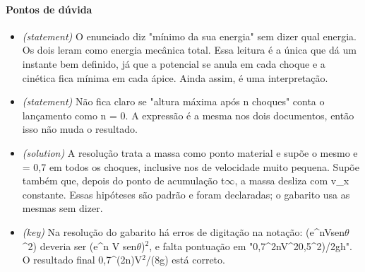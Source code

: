 \documentclass{article}%
\begin{document}
\paragraph{Pontos de dúvida}%
\begin{itemize}%
\item%
\textit{(statement)} O enunciado diz "mínimo da sua energia" sem dizer qual energia. Os dois leram como energia mecânica total. Essa leitura é a única que dá um instante bem definido, já que a potencial se anula em cada choque e a cinética fica mínima em cada ápice. Ainda assim, é uma interpretação.%
\item%
\textit{(statement)} Não fica claro se "altura máxima após n choques" conta o lançamento como n = 0. A expressão é a mesma nos dois documentos, então isso não muda o resultado.%
\item%
\textit{(solution)} A resolução trata a massa como ponto material e supõe o mesmo e = 0,7 em todos os choques, inclusive nos de velocidade muito pequena. Supõe também que, depois do ponto de acumulação t$\infty$, a massa desliza com v\_x constante. Essas hipóteses são padrão e foram declaradas; o gabarito usa as mesmas sem dizer.%
\item%
\textit{(key)} Na resolução do gabarito há erros de digitação na notação: (e\^{}nVsen$\theta$\^{}2) deveria ser (e\^{}n V sen$\theta$)$^2$, e falta pontuação em "0,7\^{}2nV\^{}20,5\^{}2)/2gh". O resultado final 0,7\^{}(2n)V$^2$/(8g) está correto.%
\end{itemize}%
\end{document}
